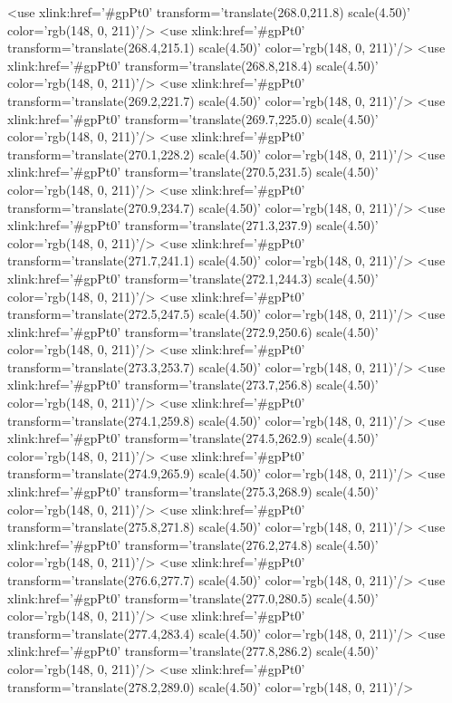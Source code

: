 	<use xlink:href='#gpPt0' transform='translate(268.0,211.8) scale(4.50)' color='rgb(148,   0, 211)'/>
	<use xlink:href='#gpPt0' transform='translate(268.4,215.1) scale(4.50)' color='rgb(148,   0, 211)'/>
	<use xlink:href='#gpPt0' transform='translate(268.8,218.4) scale(4.50)' color='rgb(148,   0, 211)'/>
	<use xlink:href='#gpPt0' transform='translate(269.2,221.7) scale(4.50)' color='rgb(148,   0, 211)'/>
	<use xlink:href='#gpPt0' transform='translate(269.7,225.0) scale(4.50)' color='rgb(148,   0, 211)'/>
	<use xlink:href='#gpPt0' transform='translate(270.1,228.2) scale(4.50)' color='rgb(148,   0, 211)'/>
	<use xlink:href='#gpPt0' transform='translate(270.5,231.5) scale(4.50)' color='rgb(148,   0, 211)'/>
	<use xlink:href='#gpPt0' transform='translate(270.9,234.7) scale(4.50)' color='rgb(148,   0, 211)'/>
	<use xlink:href='#gpPt0' transform='translate(271.3,237.9) scale(4.50)' color='rgb(148,   0, 211)'/>
	<use xlink:href='#gpPt0' transform='translate(271.7,241.1) scale(4.50)' color='rgb(148,   0, 211)'/>
	<use xlink:href='#gpPt0' transform='translate(272.1,244.3) scale(4.50)' color='rgb(148,   0, 211)'/>
	<use xlink:href='#gpPt0' transform='translate(272.5,247.5) scale(4.50)' color='rgb(148,   0, 211)'/>
	<use xlink:href='#gpPt0' transform='translate(272.9,250.6) scale(4.50)' color='rgb(148,   0, 211)'/>
	<use xlink:href='#gpPt0' transform='translate(273.3,253.7) scale(4.50)' color='rgb(148,   0, 211)'/>
	<use xlink:href='#gpPt0' transform='translate(273.7,256.8) scale(4.50)' color='rgb(148,   0, 211)'/>
	<use xlink:href='#gpPt0' transform='translate(274.1,259.8) scale(4.50)' color='rgb(148,   0, 211)'/>
	<use xlink:href='#gpPt0' transform='translate(274.5,262.9) scale(4.50)' color='rgb(148,   0, 211)'/>
	<use xlink:href='#gpPt0' transform='translate(274.9,265.9) scale(4.50)' color='rgb(148,   0, 211)'/>
	<use xlink:href='#gpPt0' transform='translate(275.3,268.9) scale(4.50)' color='rgb(148,   0, 211)'/>
	<use xlink:href='#gpPt0' transform='translate(275.8,271.8) scale(4.50)' color='rgb(148,   0, 211)'/>
	<use xlink:href='#gpPt0' transform='translate(276.2,274.8) scale(4.50)' color='rgb(148,   0, 211)'/>
	<use xlink:href='#gpPt0' transform='translate(276.6,277.7) scale(4.50)' color='rgb(148,   0, 211)'/>
	<use xlink:href='#gpPt0' transform='translate(277.0,280.5) scale(4.50)' color='rgb(148,   0, 211)'/>
	<use xlink:href='#gpPt0' transform='translate(277.4,283.4) scale(4.50)' color='rgb(148,   0, 211)'/>
	<use xlink:href='#gpPt0' transform='translate(277.8,286.2) scale(4.50)' color='rgb(148,   0, 211)'/>
	<use xlink:href='#gpPt0' transform='translate(278.2,289.0) scale(4.50)' color='rgb(148,   0, 211)'/>

